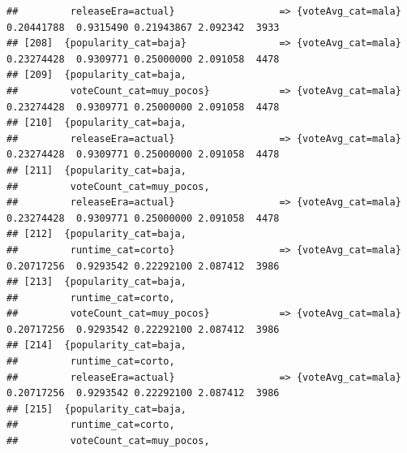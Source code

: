 \documentclass[
]{article}
\begin{document}
\begin{verbatim}
##         releaseEra=actual}                  => {voteAvg_cat=mala}                0.20441788  0.9315490 0.21943867 2.092342  3933
## [208]  {popularity_cat=baja}                => {voteAvg_cat=mala}                0.23274428  0.9309771 0.25000000 2.091058  4478
## [209]  {popularity_cat=baja,                                                                                                    
##         voteCount_cat=muy_pocos}            => {voteAvg_cat=mala}                0.23274428  0.9309771 0.25000000 2.091058  4478
## [210]  {popularity_cat=baja,                                                                                                    
##         releaseEra=actual}                  => {voteAvg_cat=mala}                0.23274428  0.9309771 0.25000000 2.091058  4478
## [211]  {popularity_cat=baja,                                                                                                    
##         voteCount_cat=muy_pocos,                                                                                                
##         releaseEra=actual}                  => {voteAvg_cat=mala}                0.23274428  0.9309771 0.25000000 2.091058  4478
## [212]  {popularity_cat=baja,                                                                                                    
##         runtime_cat=corto}                  => {voteAvg_cat=mala}                0.20717256  0.9293542 0.22292100 2.087412  3986
## [213]  {popularity_cat=baja,                                                                                                    
##         runtime_cat=corto,                                                                                                      
##         voteCount_cat=muy_pocos}            => {voteAvg_cat=mala}                0.20717256  0.9293542 0.22292100 2.087412  3986
## [214]  {popularity_cat=baja,                                                                                                    
##         runtime_cat=corto,                                                                                                      
##         releaseEra=actual}                  => {voteAvg_cat=mala}                0.20717256  0.9293542 0.22292100 2.087412  3986
## [215]  {popularity_cat=baja,                                                                                                    
##         runtime_cat=corto,                                                                                                      
##         voteCount_cat=muy_pocos,                                                                                                

\end{verbatim}
\end{document}
